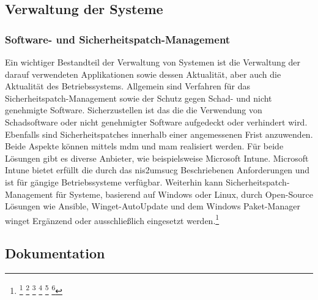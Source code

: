 \documentclass[11pt,a4paper,hidelinks]{article}   %
\begin{document}
        \subsection{Verwaltung der Systeme}
            \subsubsection{Software- und Sicherheitspatch-Management}
            Ein wichtiger Bestandteil der Verwaltung von Systemen ist die Verwaltung der darauf verwendeten Applikationen sowie dessen Aktualität, aber auch die Aktualität des Betriebssystems. Allgemein sind Verfahren für das Sicherheitspatch-Management sowie der Schutz gegen Schad- und nicht genehmigte Software. Sicherzustellen ist das die die Verwendung von Schadsoftware oder nicht genehmigter Software aufgedeckt oder verhindert wird. Ebenfalls sind Sicherheitspatches innerhalb einer angemessenen Frist anzuwenden. Beide Aspekte können mittels \gls{mdm} und \gls{mam} realisiert werden. Für beide Lösungen gibt es diverse Anbieter, wie beispielsweise Microsoft Intune. Microsoft Intune bietet erfüllt die durch das \gls{nis2umsucg} Beschriebenen Anforderungen und ist für gängige Betriebssysteme verfügbar. Weiterhin kann Sicherheitspatch-Management für Systeme, basierend auf Windows oder Linux, durch Open-Source Lösungen wie Ansible, Winget-AutoUpdate und dem Windows Paket-Manager winget Ergänzend oder ausschließlich eingesetzt werden.\footnote{
                \footcite[Vgl. S. 21 und 118][]{9781509301331}
                \footcite[Vgl. S. 1][]{microsoft:731618}
                \footcite[Vgl. S. 1][]{github:731618}
                \footcite[Vgl. S. 397 - 380][]{10.1365-s40702-015-0117-5}
                \footcite[Vgl. S. 29 - 30][]{9781837631636}
                \footcite[Vgl. S. 1][]{microsoft:5f43b2}
            }
            
        \subsection{Dokumentation}
\end{document}
